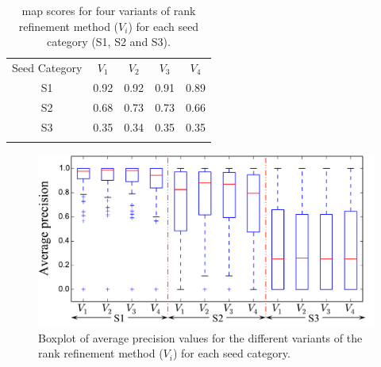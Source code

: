 \begin{table} 
	\begin{centering}	
		\begin{tabular}{ c | c c c c}
			\tabletop
			Seed Category   & $V_1$		&	$V_2$ & $V_3$	 &	$V_4$ 	\\	
			\tablemid
			S1 & 0.92    &	0.92		&	0.91    &	0.89\\
			S2 & 0.68    &	0.73		&	0.73    &	0.66\\
			S3 & 0.35    &	0.34    &	0.35    &	0.35\\
			\tablebot
		\end{tabular}
		\caption{\gls{map} scores for four variants of rank refinement method ($V_i$) for each seed category (S1, S2 and S3).}
		\label{tab:meanAveragePrecision_pattern_discovery}
		\par \end{centering}	
\end{table}

\begin{figure}
	\begin{center}
		\includegraphics[width=\figSizeHundred]{ch06_patterns/figures/discovery/boxPlot.pdf}
	\end{center}
	\caption{Boxplot of average precision values for the different variants of the rank refinement method ($V_i$) for each seed category. }
	\label{fig:boxPlotMAPPatternDiscovery}
\end{figure}

